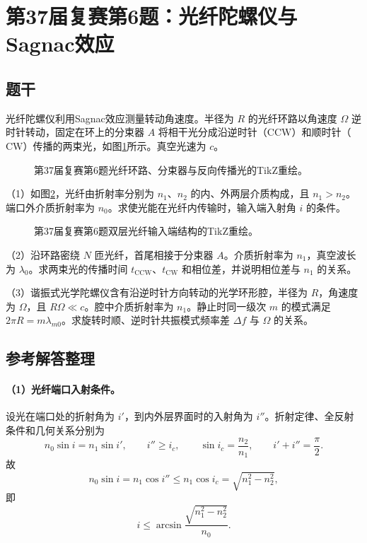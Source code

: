 \section{第37届复赛第6题：光纤陀螺仪与Sagnac效应}

\subsection{题干}
光纤陀螺仪利用Sagnac效应测量转动角速度。半径为 $R$ 的光纤环路以角速度 $\Omega$ 逆时针转动，固定在环上的分束器 $A$ 将相干光分成沿逆时针（$\mathrm{CCW}$）和顺时针（$\mathrm{CW}$）传播的两束光，如图\ref{fig:cpho37q06a}所示。真空光速为 $c$。
\begin{figure}[htbp]\centering

\caption{第37届复赛第6题光纤环路、分束器与反向传播光的TikZ重绘。}\label{fig:cpho37q06a}
\end{figure}

（1）如图\ref{fig:cpho37q06b}，光纤由折射率分别为 $n_1$、$n_2$ 的内、外两层介质构成，且 $n_1>n_2$。端口外介质折射率为 $n_0$。求使光能在光纤内传输时，输入端入射角 $i$ 的条件。
\begin{figure}[htbp]\centering

\caption{第37届复赛第6题双层光纤输入端结构的TikZ重绘。}\label{fig:cpho37q06b}
\end{figure}

（2）沿环路密绕 $N$ 匝光纤，首尾相接于分束器 $A$。介质折射率为 $n_1$，真空波长为 $\lambda_0$。求两束光的传播时间 $t_{\mathrm{CCW}}$、$t_{\mathrm{CW}}$ 和相位差，并说明相位差与 $n_1$ 的关系。

（3）谐振式光学陀螺仪含有沿逆时针方向转动的光学环形腔，半径为 $R$，角速度为 $\Omega$，且 $R\Omega\ll c$。腔中介质折射率为 $n_1$。静止时同一级次 $m$ 的模式满足 $2\pi R=m\lambda_{m0}$。求旋转时顺、逆时针共振模式频率差 $\Delta f$ 与 $\Omega$ 的关系。

\subsection{参考解答整理}
\paragraph{（1）光纤端口入射条件。}
设光在端口处的折射角为 $i'$，到内外层界面时的入射角为 $i''$。折射定律、全反射条件和几何关系分别为
\[
n_0\sin i=n_1\sin i',\qquad
i''\geqslant i_c,\qquad \sin i_c=\frac{n_2}{n_1},\qquad
i'+i''=\frac\pi2.
\]
故
\[
n_0\sin i=n_1\cos i''\leqslant n_1\cos i_c
=\sqrt{n_1^2-n_2^2},
\]
即
\[
\boxed{i\leqslant\arcsin\frac{\sqrt{n_1^2-n_2^2}}{n_0}.}
\]

